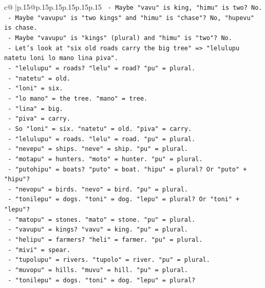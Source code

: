 \documentclass{article}
\begin{document}
{\begin{supertabular}{c@{$\;$}|p{.15\linewidth}@{}p{.15\linewidth}p{.15\linewidth}p{.15\linewidth}p{.15\linewidth}p{.15\linewidth}}
{{{\texttt{        {-} Maybe "vavu" is king, "himu" is two? No.} \\
\texttt{        {-} Maybe "vavupu" is "two kings" and "himu" is "chase"? No, "hupevu" is chase.} \\
\texttt{        {-} Maybe "vavupu" is "kings" (plural) and "himu" is "two"? No.} \\
\texttt{        {-} Let's look at "six old roads carry the big tree" => "lelulupu natetu loni lo mano lina piva".} \\
\texttt{          {-} "lelulupu" = roads? "lelu" = road? "pu" = plural.} \\
\texttt{          {-} "natetu" = old.} \\
\texttt{          {-} "loni" = six.} \\
\texttt{          {-} "lo mano" = the tree. "mano" = tree.} \\
\texttt{          {-} "lina" = big.} \\
\texttt{          {-} "piva" = carry.} \\
\texttt{        {-} So "loni" = six. "natetu" = old. "piva" = carry.} \\
\texttt{        {-} "lelulupu" = roads. "lelu" = road. "pu" = plural.} \\
\texttt{        {-} "nevepu" = ships. "neve" = ship. "pu" = plural.} \\
\texttt{        {-} "motapu" = hunters. "moto" = hunter. "pu" = plural.} \\
\texttt{        {-} "putohipu" = boats? "puto" = boat. "hipu" = plural? Or "puto" + "hipu"?} \\
\texttt{        {-} "nevopu" = birds. "nevo" = bird. "pu" = plural.} \\
\texttt{        {-} "tonilepu" = dogs. "toni" = dog. "lepu" = plural? Or "toni" + "lepu"?} \\
\texttt{        {-} "matopu" = stones. "mato" = stone. "pu" = plural.} \\
\texttt{        {-} "vavupu" = kings? "vavu" = king. "pu" = plural.} \\
\texttt{        {-} "helipu" = farmers? "heli" = farmer. "pu" = plural.} \\
\texttt{        {-} "mivi" = spear.} \\
\texttt{        {-} "tupolupu" = rivers. "tupolo" = river. "pu" = plural.} \\
\texttt{        {-} "muvopu" = hills. "muvu" = hill. "pu" = plural.} \\
\texttt{        {-} "tonilepu" = dogs. "toni" = dog. "lepu" = plural?} \\
}}}
\end{supertabular}}
\end{document}
